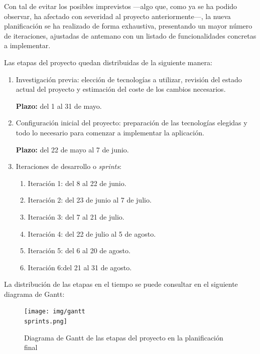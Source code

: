 \documentclass[10pt, a4paper]{aqademic}
\begin{document}
Con tal de evitar los posibles imprevistos ---algo que, como ya se ha podido observar, ha afectado con severidad al proyecto anteriormente---, la nueva planificación se ha realizado de forma exhaustiva, presentando un mayor número de iteraciones, ajustadas de antemano con un listado de funcionalidades concretas a implementar.

Las etapas del proyecto quedan distribuidas de la siguiente manera:

\begin{enumerate}
	\item Investigación previa: elección de tecnologías a utilizar, revisión del estado actual del proyecto y estimación del coste de los cambios necesarios.
	
	\textbf{Plazo:} del 1 al 31 de mayo. 
	
	\item Configuración inicial del proyecto: preparación de las tecnologías elegidas y todo lo necesario para comenzar a implementar la aplicación.
	
	\textbf{Plazo:} del 22 de mayo al 7 de junio.
	
	\item Iteraciones de desarrollo o \textit{sprints}: 
	\begin{enumerate}
		\item Iteración 1: del 8 al 22 de junio.
		
		\item Iteración 2: del 23 de junio al  7 de julio.
		
		\item Iteración 3: del 7 al 21 de julio.
		
		\item Iteración 4: del 22 de julio al 5 de agosto.
		
		\item Iteración 5: del 6 al 20 de agosto.
		
		\item Iteración 6:del 21 al 31 de agosto.
	\end{enumerate}
\end{enumerate}

La distribución de las etapas en el tiempo se puede consultar en el siguiente diagrama de Gantt:

\medskip

\begin{figure}[h]
	\centering
	\texttt{[image: img/gantt\\ sprints.png]}
	\caption{Diagrama de Gantt de las etapas del proyecto en la planificación final}
\end{figure}
\end{document}
